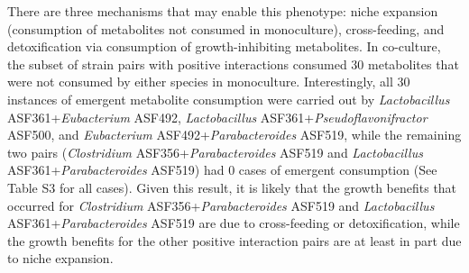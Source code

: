 \documentclass[11pt,twocolumn,notitlepage,openany,twoside]{book}
\begin{document}
\begin{refsection}
There are three mechanisms that may enable this phenotype: niche expansion (consumption of metabolites not consumed in monoculture), cross-feeding, and detoxification via consumption of growth-inhibiting metabolites. In co-culture, the subset of strain pairs with positive interactions consumed 30 metabolites that were not consumed by either species in monoculture. Interestingly, all 30 instances of emergent metabolite consumption were carried out by \textit{Lactobacillus} ASF361+\textit{Eubacterium} ASF492, \textit{Lactobacillus} ASF361+\textit{Pseudoflavonifractor} ASF500, and \textit{Eubacterium} ASF492+\textit{Parabacteroides} ASF519, while the remaining two pairs (\textit{Clostridium} ASF356+\textit{Parabacteroides} ASF519 and \textit{Lactobacillus} ASF361+\textit{Parabacteroides} ASF519) had 0 cases of emergent consumption (See Table S3 for all cases). Given this result, it is likely that the growth benefits that occurred for \textit{Clostridium} ASF356+\textit{Parabacteroides} ASF519 and \textit{Lactobacillus} ASF361+\textit{Parabacteroides} ASF519 are due to cross-feeding or detoxification, while the growth benefits for the other positive interaction pairs are at least in part due to niche expansion.


\end{refsection}
\end{document}
